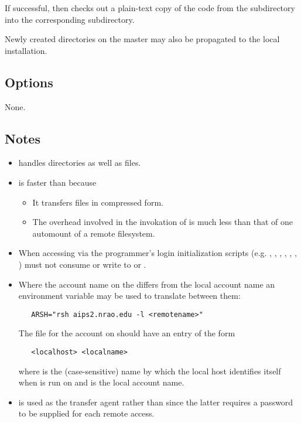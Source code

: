 If successful,  then checks out a plain-text copy of the code from the
 subdirectory into the corresponding 
subdirectory.
 
Newly created directories on the master may also be propagated to the local
installation.
 
\subsection*{Options}
 
None.

\subsection*{Notes}
 
\begin{itemize}
\item
    handles directories as well as files.
 
\item
    is faster than  because
 
   \begin{itemize}
   \item
      It transfers files in compressed form.
 
   \item
      The overhead involved in the invokation of  is much less
      than that of one automount of a remote filesystem.
   \end{itemize}
 
\item
   When accessing  via  the programmer's
   login initialization scripts (e.g. , ,
   , , , , )
   must not consume  or write to  or .
 
\item
   Where the account name on the  differs from the local
   account name an environment variable may be used to translate between them:
 
\begin{verbatim}
   ARSH="rsh aips2.nrao.edu -l <remotename>"
\end{verbatim}
 
   \noindent
   The  file for the  account on
    should have an entry of the form
 
\begin{verbatim}
   <localhost> <localname>
\end{verbatim}
 
   \noindent
   where  is the (case-sensitive) name by which the local
   host identifies itself when  is run on
    and  is the local account name.
 
\item
    is used as the transfer agent rather than  since
   the latter requires a password to be supplied for each remote access.
\end{itemize}

